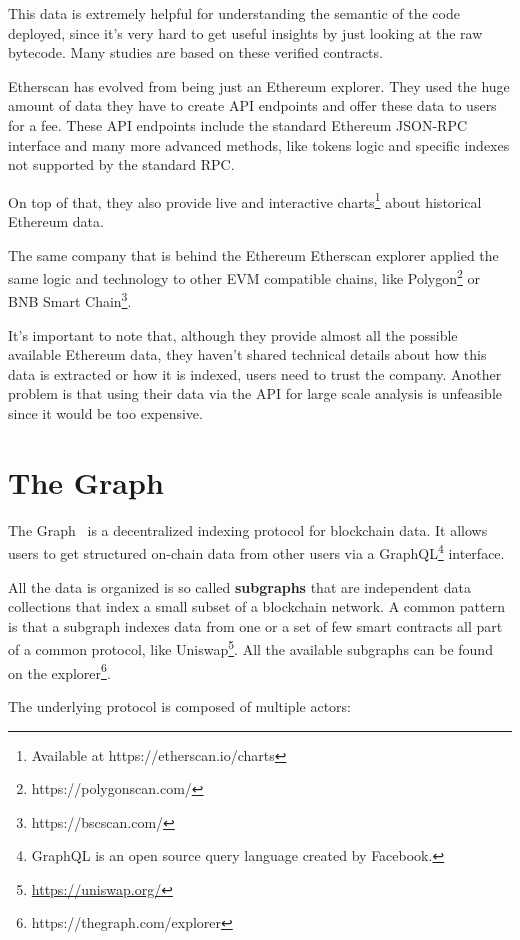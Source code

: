 This data is extremely helpful for understanding the semantic of the code deployed, since it's very hard to get useful insights by just looking at the raw bytecode. Many studies are based on these verified contracts.

Etherscan has evolved from being just an Ethereum explorer. They used the huge amount of data they have to create API endpoints and offer these data to users for a fee. These API endpoints include the standard Ethereum JSON-RPC interface and many more advanced methods, like tokens logic and specific indexes not supported by the standard RPC. 

On top of that, they also provide live and interactive charts\footnote{Available at https://etherscan.io/charts} about historical Ethereum data.

The same company that is behind the Ethereum Etherscan explorer applied the same logic and technology to other EVM compatible chains, like Polygon\footnote{https://polygonscan.com/} or BNB Smart Chain\footnote{https://bscscan.com/}.

It's important to note that, although they provide almost all the possible available Ethereum data, they haven't shared technical details about how this data is extracted or how it is indexed, users need to trust the company. Another problem is that using their data via the API for large scale analysis is unfeasible since it would be too expensive.


\section{The Graph}

The Graph~\cite{the-graph} is a decentralized indexing protocol for blockchain data. It allows users to get structured on-chain data from other users via a GraphQL\footnote{GraphQL is an open source query language created by Facebook.} interface. 

All the data is organized is so called \textbf{subgraphs} that are independent data collections that index a small subset of a blockchain network. A common pattern is that a subgraph indexes data from one or a set of few smart contracts all part of a common protocol, like Uniswap\footnote{\url{https://uniswap.org/}}. All the available subgraphs can be found on the explorer\footnote{https://thegraph.com/explorer}.

The underlying protocol is composed of multiple actors:

